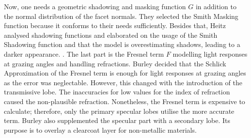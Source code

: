 Now, one needs a geometric shadowing and masking function $G$ in addition to the normal distribution of the facet normals.
They selected the Smith Masking function because it conforms to their needs sufficiently.
Besides that, Heitz analysed shadowing functions and elaborated on the usage of the Smith Shadowing function and that the model is overestimating shadows, leading to a darker appearance. \cite{heitz_understanding_2014}.
The last part is the Fresnel term $F$ modelling light responses at grazing angles and handling refractions.
Burley decided that the Schlick Approximation \cite{schlick_inexpensive_1994} of the Fresnel term is enough for light responses at grazing angles as the error was neglectable. 
However, this changed with the introduction of the transmissive lobe.
The inaccuracies for low values for the index of refraction caused the non-plausible refraction.
Nonetheless, the Fresnel term is expensive to calculate; therefore, only the primary specular lobes utilise the more accurate term.
Burley also supplemented the specular part with a secondary lobe.
Its purpose is to overlay a clearcoat layer for non-metallic materials. 
